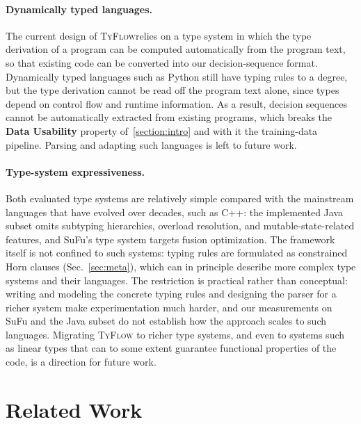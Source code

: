 \documentclass[manuscript,screen]{acmart}
\newcommand{\toolname}[1]{\textsc{#1}}
\newcommand{\mainname}{\toolname{TyFlow}\xspace}
\begin{document}
\paragraph{{\color{revblue}Dynamically typed languages.}}
{\color{revblue}The current design of }\mainname {\color{revblue}relies on a type system in which the type derivation of a program can be computed automatically from the program text, so that existing code can be converted into our decision-sequence format.
Dynamically typed languages such as Python still have typing rules to a degree, but the type derivation cannot be read off the program text alone, since types depend on control flow and runtime information.
As a result, decision sequences cannot be automatically extracted from existing programs, which breaks the }\textbf{\color{revblue}Data Usability} {\color{revblue}property of~}\autoref{section:intro} {\color{revblue}and with it the training-data pipeline.
Parsing and adapting such languages is left to future work.
}

\paragraph{{\color{revblue}Type-system expressiveness.}}
{\color{revblue}Both evaluated type systems are relatively simple compared with the mainstream languages that have evolved over decades, such as C++: the implemented Java subset omits subtyping hierarchies, overload resolution, and mutable-state-related features, and SuFu's type system targets fusion optimization.
The framework itself is not confined to such systems: typing rules are formulated as constrained Horn clauses (Sec.~\ref{sec:meta}), which can in principle describe more complex type systems and their languages.
The restriction is practical rather than conceptual: writing and modeling the concrete typing rules and designing the parser for a richer system make experimentation much harder, and our measurements on SuFu and the Java subset do not establish how the approach scales to such languages.
Migrating }\mainname{} {\color{revblue}to richer type systems, and even to systems such as linear types that can to some extent guarantee functional properties of the code, is a direction for future work.
}


 \section{Related Work}\label{sec:related}
\end{document}
